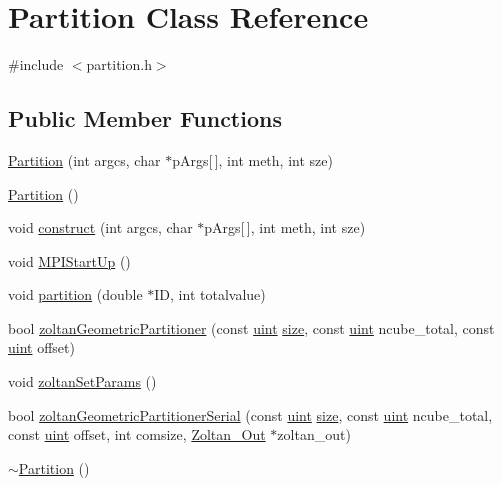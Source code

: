 \hypertarget{classPartition}{}\section{Partition Class Reference}
\label{classPartition}


{\ttfamily \#include $<$partition.\+h$>$}

\subsection*{Public Member Functions}
\begin{DoxyCompactItemize}
\item 
\mbox{\hyperlink{classPartition_a689f61995d4ad15721d032ce7b6b696e}{Partition}} (int argcs, char $\ast$p\+Args\mbox{[}$\,$\mbox{]}, int meth, int sze)
\item 
\mbox{\hyperlink{classPartition_aa8a055cfc129cee2a2ef024556fb6c0d}{Partition}} ()
\item 
void \mbox{\hyperlink{classPartition_a26c1692ea81e7cf1129dac8e82b9fd38}{construct}} (int argcs, char $\ast$p\+Args\mbox{[}$\,$\mbox{]}, int meth, int sze)
\item 
void \mbox{\hyperlink{classPartition_ae6fcae8693a77d196cec7eeb91a14b92}{M\+P\+I\+Start\+Up}} ()
\item 
void \mbox{\hyperlink{classPartition_a7cfafd27a1ace83611ad244cf6fc0bcf}{partition}} (double $\ast$ID, int totalvalue)
\item 
bool \mbox{\hyperlink{classPartition_aa3a2a24791661618215c0ef6be361ac1}{zoltan\+Geometric\+Partitioner}} (const \mbox{\hyperlink{definitions_8h_a69aa29b598b851b0640aa225a9e5d61d}{uint}} \mbox{\hyperlink{classPartition_a718bdba639f222d90d23480b58caa1f9}{size}}, const \mbox{\hyperlink{definitions_8h_a69aa29b598b851b0640aa225a9e5d61d}{uint}} ncube\+\_\+total, const \mbox{\hyperlink{definitions_8h_a69aa29b598b851b0640aa225a9e5d61d}{uint}} offset)
\item 
void \mbox{\hyperlink{classPartition_ab1080a75f5acfd3d8b80f3c8d55595e2}{zoltan\+Set\+Params}} ()
\item 
bool \mbox{\hyperlink{classPartition_a139185844918e181a8ceebbe239d307f}{zoltan\+Geometric\+Partitioner\+Serial}} (const \mbox{\hyperlink{definitions_8h_a69aa29b598b851b0640aa225a9e5d61d}{uint}} \mbox{\hyperlink{classPartition_a718bdba639f222d90d23480b58caa1f9}{size}}, const \mbox{\hyperlink{definitions_8h_a69aa29b598b851b0640aa225a9e5d61d}{uint}} ncube\+\_\+total, const \mbox{\hyperlink{definitions_8h_a69aa29b598b851b0640aa225a9e5d61d}{uint}} offset, int comsize, \mbox{\hyperlink{structZoltan__Out}{Zoltan\+\_\+\+Out}} $\ast$zoltan\+\_\+out)
\item 
\mbox{\hyperlink{classPartition_a4d134cb81c72c674b162a0d21dbaabfb}{$\sim$\+Partition}} ()
\end{DoxyCompactItemize}
